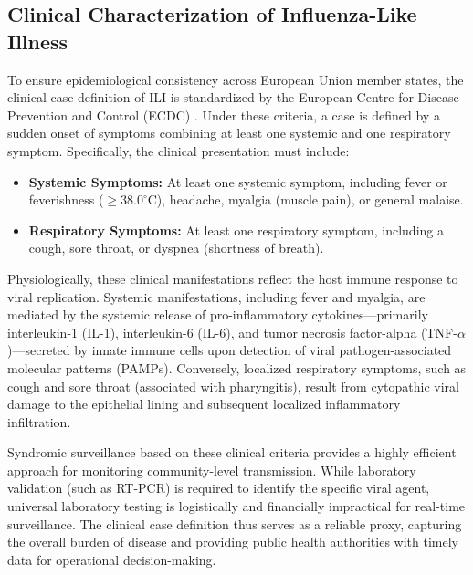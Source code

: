 \subsection{Clinical Characterization of Influenza-Like Illness}
To ensure epidemiological consistency across European Union member states, the clinical case definition of ILI is standardized by the European Centre for Disease Prevention and Control (ECDC) \cite{ecdc_definition}. Under these criteria, a case is defined by a sudden onset of symptoms combining at least one systemic and one respiratory symptom. Specifically, the clinical presentation must include:
\begin{itemize}
    \item \textbf{Systemic Symptoms:} At least one systemic symptom, including fever or feverishness ($\ge 38.0^\circ\text{C}$), headache, myalgia (muscle pain), or general malaise.
    \item \textbf{Respiratory Symptoms:} At least one respiratory symptom, including a cough, sore throat, or dyspnea (shortness of breath).
\end{itemize}

Physiologically, these clinical manifestations reflect the host immune response to viral replication. Systemic manifestations, including fever and myalgia, are mediated by the systemic release of pro-inflammatory cytokines---primarily interleukin-1 (IL-1), interleukin-6 (IL-6), and tumor necrosis factor-alpha (TNF-$\alpha$)---secreted by innate immune cells upon detection of viral pathogen-associated molecular patterns (PAMPs). Conversely, localized respiratory symptoms, such as cough and sore throat (associated with pharyngitis), result from cytopathic viral damage to the epithelial lining and subsequent localized inflammatory infiltration.

Syndromic surveillance based on these clinical criteria provides a highly efficient approach for monitoring community-level transmission. While laboratory validation (such as RT-PCR) is required to identify the specific viral agent, universal laboratory testing is logistically and financially impractical for real-time surveillance. The clinical case definition thus serves as a reliable proxy, capturing the overall burden of disease and providing public health authorities with timely data for operational decision-making.

